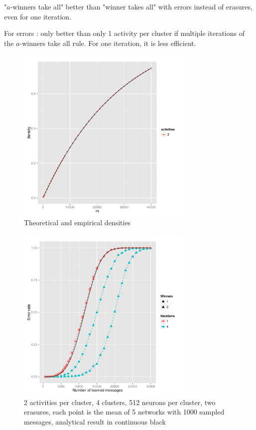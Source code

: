 \documentclass[english,11pt,twocolumn]{article}
\theoremstyle{definition}
\begin{document}
		"$a$-winners take all" better than "winner takes all" with errors instead of erasures, even for one iteration.
	
	For errors : only better than only 1 activity per cluster if multiple iterations of the $a$-winners take all rule.
	For one iteration, it is less efficient.
	\begin{figure}[!htb]
		\includegraphics[width=8.5cm]{Courbes/densiteexemple.pdf}
		\caption{Theoretical and empirical densities}
			\label{densiteth}
	\end{figure}
	
	\begin{figure}[!htb]
		\includegraphics[width=8.5cm]{Courbes/remplacement_figure2g1} %
		\caption{2 activities per cluster, 4 clusters, 512 neurons per cluster, two erasures, each point is the mean of 5 networks with 1000 sampled messages, analytical result in continuous black}
			\label{erasuresth}
		\end{figure}
			
\end{document}

